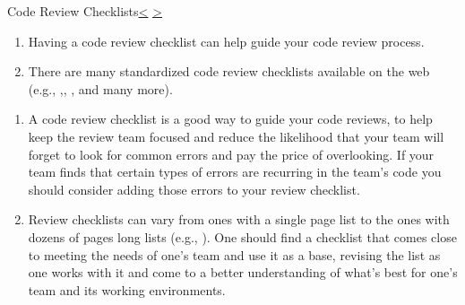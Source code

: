 \documentclass[12pt]{extarticle}
\newenvironment{instructionblock}{\Large\bgroup}{\egroup}
\begin{document}


\pagebreak
\begin{slide}{Code Review Checklists}{\hyperref[slide 16]{\textless} \hyperref[slide 18]{\textgreater}}
	\vskip 10pt
	\begin{instructionblock}
	\begin{enumerate} 
	\item Having a code review checklist can help guide your code review process.
	\item There are many standardized code review checklists available on the web (e.g., \cite{BaldwinCodeReview},\cite{CodeInspectionRules}, \cite{NWSCodeReview}, and many more).
	\end{enumerate}
	\end{instructionblock}
\end{slide}
\begin{enumerate}
\item A code review checklist is a good way to guide your code reviews, to help keep the review team focused and reduce the likelihood that your team will forget to look for common errors and pay the price of overlooking.  If your team finds that certain types of errors are recurring in the team's code you should consider adding those errors to your review checklist.
\item Review checklists can vary from ones with a single page list to the ones with dozens of pages long lists (e.g., \cite{BaldwinCodeReview}). One should find a checklist that comes close to meeting the needs of one's team and use it as a base, revising the list as one works with it and come to a better understanding of what's best for one's team and its working environments.
\end{enumerate}


\end{document}
